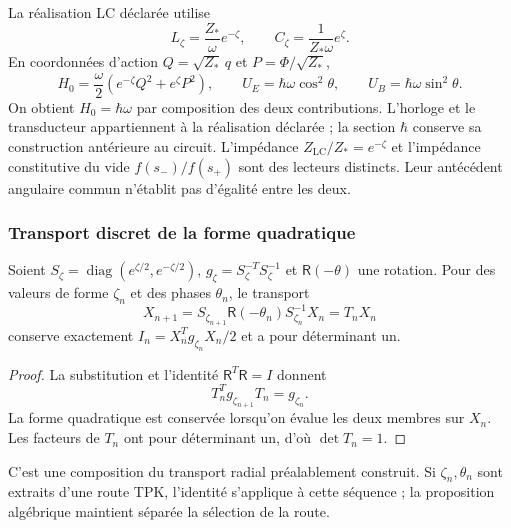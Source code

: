 La réalisation LC déclarée utilise
\begin{equation}
 L_\zeta=\frac{Z_*}{\omega}e^{-\zeta},\qquad
 C_\zeta=\frac{1}{Z_*\omega}e^\zeta.
 \label{md:hib:lc}
\end{equation}
En coordonnées d’action $Q=\sqrt{Z_*}\,q$ et
$P=\Phi/\sqrt{Z_*}$,
\begin{equation}
 H_0=\frac{\omega}{2}
 \left(e^{-\zeta}Q^2+e^\zeta P^2\right),\qquad
 U_E=\hbar\omega\cos^2\theta,\qquad
 U_B=\hbar\omega\sin^2\theta.
 \label{md:hib:energia-elipse}
\end{equation}
On obtient $H_0=\hbar\omega$ par composition des deux contributions.
L’horloge et le transducteur appartiennent à la réalisation déclarée ; la section
$\hbar$ conserve sa construction antérieure au circuit. L’impédance
$Z_{\mathrm{LC}}/Z_*=e^{-\zeta}$ et l’impédance constitutive du vide
$f(s_-)/f(s_+)$ sont des lecteurs distincts. Leur antécédent angulaire commun
n’établit pas d’égalité entre les deux.

\subsubsection{Transport discret de la forme quadratique}
\label{md:hib:transporte-discreto}

\begin{proposition}
\label{md:hib:proposicion-discreta}
Soient $S_\zeta=\operatorname{diag}(e^{\zeta/2},e^{-\zeta/2})$,
$g_\zeta=S_\zeta^{-T}S_\zeta^{-1}$ et
$\mathsf R(-\theta)$ une rotation. Pour des valeurs de forme $\zeta_n$ et des
phases $\theta_n$, le transport
\begin{equation}
 X_{n+1}=S_{\zeta_{n+1}}\mathsf R(-\theta_n)S_{\zeta_n}^{-1}X_n
 =T_nX_n
 \label{md:hib:transporte}
\end{equation}
conserve exactement
$I_n=X_n^Tg_{\zeta_n}X_n/2$ et a pour déterminant un.
\end{proposition}
\begin{proof}
La substitution et l’identité $\mathsf R^T\mathsf R=I$ donnent
\begin{equation}
 T_n^Tg_{\zeta_{n+1}}T_n=g_{\zeta_n}.
 \label{md:hib:isometria-transportada}
\end{equation}
La forme quadratique est conservée lorsqu’on évalue les deux membres sur $X_n$.
Les facteurs de $T_n$ ont pour déterminant un, d’où
$\det T_n=1$.
\end{proof}
C’est une composition du transport radial préalablement construit. Si
$\zeta_n,\theta_n$ sont extraits d’une route TPK, l’identité s’applique à
cette séquence ; la proposition algébrique maintient séparée la sélection
de la route.

